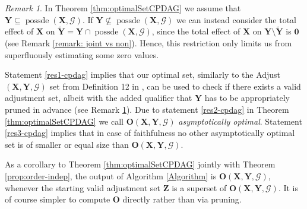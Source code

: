 \documentclass[11pt,a4paper]{article}
\theoremstyle{definition}
\theoremstyle{remark}
\newtheorem{Remark}[Satz]{Remark}
\DeclareMathOperator{\possde}{possde}
\newcommand{\g}[1][G]{\mathcal{#1}}
\newcommand{\optb}[2][X,Y]{\mathbf{O}(\mathbf{#1},#2)}
\begin{document}
\begin{Remark}
	In Theorem \ref{thm:optimalSetCPDAG} we assume that $\mathbf{Y} \subseteq \possde(\mathbf{X},\g)$. If 
	$\mathbf{Y} \not\subseteq \possde(\mathbf{X},\g)$ we can instead consider the total effect of $\mathbf{X}$ on $\tilde{\mathbf{Y}} = \mathbf{Y}\cap \possde(\mathbf{X},\g)$, since the total effect of $\mathbf{X}$ on $\mathbf{Y} \setminus \tilde{\mathbf{Y}}$ is $\mathbf{0}$ (see Remark \ref{remark: joint vs non}). Hence, this restriction only limits us from superfluously estimating some zero values. 
	\label{remark:pruned}
\end{Remark}




Statement \ref{res1-cpdag} implies that our optimal set, similarly to the Adjust$(\mathbf{X},\mathbf{Y},\g)$ set from Definition 12 in \citet{perkovic16}, can be used to check if there exists a valid adjustment set, albeit with the added qualifier that $\mathbf{Y}$ has to be appropriately pruned in advance (see Remark \ref{remark:pruned}). 
Due to statement \ref{res2-cpdag} in Theorem \ref{thm:optimalSetCPDAG} we call $\optb{\g}$ \emph{asymptotically optimal}. Statement \ref{res3-cpdag} implies that in case of faithfulness no other asymptotically optimal set is of smaller or equal size than $\optb{\g}$. 






As a corollary to Theorem \ref{thm:optimalSetCPDAG} jointly with Theorem \ref{prop:order-indep}, the output of Algorithm \ref{Algorithm} is $\optb{\g}$, whenever the starting valid adjustment set $\mathbf{Z}$ is a superset of $\optb{\g}$. It is of course simpler to compute $\mathbf{O}$ directly rather than via pruning.
\end{document}
